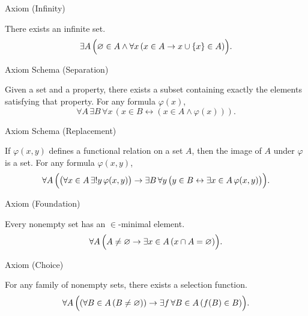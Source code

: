 \NoLocalDependencies

\begin{axiombox}{Axiom (Infinity)}
\begin{axiom}
\label{ax:infinity}
There exists an infinite set.
\[
\exists A \,
\Bigl( \varnothing \in A \land
\forall x \, (x \in A \rightarrow x \cup \{x\} \in A) \Bigr).
\]
\end{axiom}
\end{axiombox}

\NoLocalDependencies

\begin{axiombox}{Axiom Schema (Separation)}
\begin{axiom}
\label{ax:separation}
Given a set and a property, there exists a subset containing exactly the
elements satisfying that property. For any formula $\varphi(x)$,
\[
\forall A \, \exists B \,
\forall x \, (x \in B \leftrightarrow (x \in A \land \varphi(x))).
\]
\end{axiom}
\end{axiombox}

\NoLocalDependencies

\begin{axiombox}{Axiom Schema (Replacement)}
\begin{axiom}
\label{ax:replacement}
If $\varphi(x,y)$ defines a functional relation on a set $A$, then the image
of $A$ under $\varphi$ is a set. For any formula $\varphi(x,y)$,
\[
\forall A\,
\Bigl(
\bigl(\forall x \in A\, \exists! y\, \varphi(x,y)\bigr)
\rightarrow
\exists B\, \forall y\,
\bigl(y \in B \leftrightarrow \exists x \in A\, \varphi(x,y)\bigr)
\Bigr).
\]
\end{axiom}
\end{axiombox}

\NoLocalDependencies

\begin{axiombox}{Axiom (Foundation)}
\begin{axiom}
\label{ax:foundation}
Every nonempty set has an $\in$-minimal element.
\[
\forall A \,
\Bigl( A \neq \varnothing \rightarrow
\exists x \in A \, (x \cap A = \varnothing) \Bigr).
\]
\end{axiom}
\end{axiombox}

\NoLocalDependencies

\begin{axiombox}{Axiom (Choice)}
\begin{axiom}
\label{ax:choice}
For any family of nonempty sets, there exists a selection function.
\[
\forall A \,
\Bigl(
(\forall B \in A \, (B \neq \varnothing))
\rightarrow
\exists f \,
\forall B \in A \, (f(B) \in B)
\Bigr).
\]
\end{axiom}
\end{axiombox}

